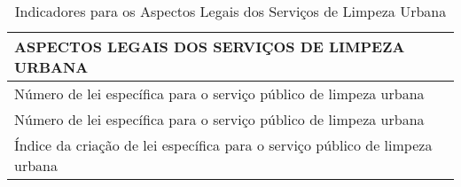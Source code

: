 \begin{table}[htbp]
  \centering
  \caption{Indicadores para os Aspectos Legais dos Serviços de Limpeza Urbana}
    \begin{tabular}{|p{27em}|}
    \toprule
    \rowcolor[rgb]{ .867,  .922,  .969}  ASPECTOS LEGAIS DOS SERVIÇOS DE LIMPEZA URBANA \\
    \midrule
    Número de lei específica para o serviço público de limpeza urbana \\
    \midrule
    Número de lei específica para o serviço público de limpeza urbana \\
    \midrule
    Índice da criação de lei específica para o serviço público de limpeza urbana \\
    \bottomrule
    \end{tabular}%
  \label{tab:ind_legal}%
\end{table}%

